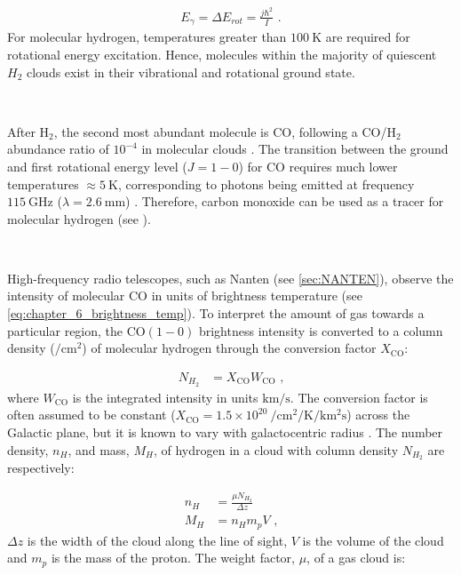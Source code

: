 \begin{equation}
    \begin{aligned}
        E_\gamma=\Delta E_{rot} = \frac{j\hbar^2}{I}\text{ .}
    \end{aligned}
\end{equation}
\noindent For molecular hydrogen, temperatures greater than $100~\si{\kelvin}$ are required for rotational energy excitation. Hence, molecules within the majority of quiescent $H_2$ clouds exist in their vibrational and rotational ground state. 
\par~\par 
After H$_2$, the second most abundant molecule is CO, following a  CO/H$_2$ abundance ratio of $10^{-4}$ in molecular clouds \citep{1994ApJ...428L..69L}. The transition between the ground and first rotational energy level ($J=1-0$) for CO requires much lower temperatures $\approx 5~\si{\kelvin}$, corresponding to photons being emitted at frequency $115~\si{\giga\hertz}$ ($\lambda=2.6~\si{\milli\meter}$) \citep{alma9927598238601811}. Therefore, carbon monoxide can be used as a tracer for molecular hydrogen (see \citep{Bolatto2013}).
\par~\par
High-frequency radio telescopes, such as Nanten (see \autoref{sec:NANTEN}), observe the intensity of molecular CO in units of brightness temperature (see \autoref{eq:chapter_6_brightness_temp}). To interpret the amount of gas towards a particular region, the CO$(1-0)$ brightness intensity is converted to a column density ($\si{\per\centi\meter\squared}$) of molecular hydrogen through the conversion factor $X_\text{CO}$:

\begin{equation}
	\begin{aligned}
		N_{H_2}&=X_\text{CO}W_\text{CO}\text{ ,}
	\end{aligned}
\end{equation}
\noindent where $W_\text{CO}$ is the integrated intensity in units $\si{\kilo\meter\per\second}$. The conversion factor is often assumed to be constant ($X_\text{CO}=1.5\times 10^{20}~\si{\per\centi\meter\squared\per\kelvin\per\kilo\meter\squared\second}$) across the Galactic plane, but it is known to vary with galactocentric radius \citep{2004A&A...422L..47S}. The number density, $n_H$, and mass, $M_H$, of hydrogen in a cloud with column density $N_{H_2}$ are respectively:

\begin{equation}
	\begin{aligned}
		n_H&=\frac{\mu N_{H_2}}{\Delta z} \label{eq:06_density_gas} \\
		M_H&=n_Hm_pV\text{ ,}
	\end{aligned}
\end{equation}
\noindent $\Delta z$ is the width of the cloud along the line of sight, $V$ is the volume of the cloud and $m_p$ is the mass of the proton. The weight factor, $\mu$, of a gas cloud is:


